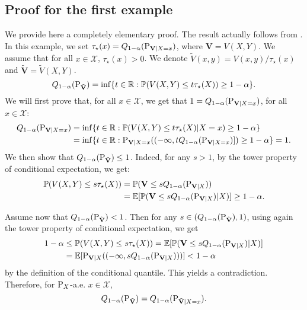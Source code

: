 
\subsection{Proof for the first example}
\label{suppl:examplesA}
  We provide here a completely elementary proof. The result actually follows from .
  In this example, we set $\tau_\star(x)=Q_{1-\alpha}(\textup{P}_{\mathbf{V}|X=x})$, where $\mathbf{V}= V(X,Y)$. We assume that for all $x \in \mathcal{X}$, $\tau_\star(x) > 0$. We denote $\tilde{V}(x,y)= V(x,y)/\tau_\star(x)$ and $\tilde{\mathbf{V}}=\tilde{V}(X,Y)$.
  \[
    Q_{1-\alpha}(\textup{P}_{\tilde{\mathbf{V}}}) = \inf\{t \in \mathbb{R} : \mathbb{P}(V(X, Y) \leq t\tau_\star(X)) \geq 1 - \alpha\}.
  \]
  We will first prove that, for all $x \in \mathcal{X}$, we get that $1 = Q_{1-\alpha}(\textup{P}_{\mathbf{V}|X=x})$, for all  $x \in \mathcal{X}$:
  \begin{align*}
    Q_{1-\alpha}(\textup{P}_{\mathbf{V}|X=x}) 
    &= \inf\{t \in \mathbb{R} : \mathbb{P}(V(X, Y) \leq t\tau_\star(X) | X=x) \geq 1 - \alpha\} \\
    &= \inf\{t \in \mathbb{R} : \textup{P}_{\mathbf{V}|X=x}((-\infty, tQ_{1-\alpha}(\textup{P}_{\mathbf{V}|X=x})]) \geq 1 - \alpha\} = 1.
  \end{align*}
  We then show that $Q_{1-\alpha}(\textup{P}_{\tilde{\mathbf{V}}}) \leq 1$. Indeed, for any $s > 1$,  by the tower property of conditional expectation, we get:
  \begin{align*}
    \mathbb{P}(V(X, Y) \leq s \tau_\star(X)) &= \mathbb{P}(\mathbf{V} \leq s Q_{1-\alpha}(\textup{P}_{\mathbf{V}|X})) \\
    &= \mathbb{E}[\mathbb{P}(\mathbf{V} \leq s Q_{1-\alpha}(\textup{P}_{\mathbf{V}|X}) | X)] \geq 1 - \alpha.
  \end{align*}

  Assume now that  $Q_{1-\alpha}(\textup{P}_{\tilde{\mathbf{V}}}) < 1$. Then for any $s \in (Q_{1-\alpha}(\textup{P}_{\tilde{\mathbf{V}}}), 1)$, using again the tower property of conditional expectation, we get
  \begin{align}
    1 - \alpha &\leq \mathbb{P}(V(X, Y) \leq s\tau_\star(X))
    = \mathbb{E}[\mathbb{P}(\mathbf{V} \leq sQ_{1-\alpha}(\textup{P}_{\mathbf{V}|X}) | X)] \\
    &= \mathbb{E}[\textup{P}_{\mathbf{V}|X}((-\infty, s Q_{1-\alpha}(\textup{P}_{\mathbf{V}|X})))]
    < 1 - \alpha
  \end{align}
  by the definition of the conditional quantile.
  This yields a contradiction. Therefore, for $\textup{P}_X$-a.e. $x \in \mathcal{X}$, 
  \[
    Q_{1-\alpha}(\textup{P}_{\tilde{\mathbf{V}}}) = Q_{1-\alpha}(\textup{P}_{\tilde{\mathbf{V}}|X=x}).
  \]
